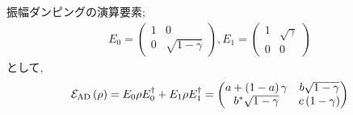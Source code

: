 \begin{ex}
    \label{ex8.22}
    振幅ダンピングの演算要素;
    \begin{align*}
        E_0 =
        \begin{pmatrix}
            1 & 0                \\
            0 & \sqrt{1- \gamma}
        \end{pmatrix}
        ,
        E_1 =
        \begin{pmatrix}
            1 & \sqrt{\gamma} \\
            0 & 0
        \end{pmatrix}
    \end{align*}
    として,
    \begin{align*}
        \mathcal{E}_\mathrm{AD} \left(\rho\right)
        =
        E_0 \rho E_0^\dagger + E_1 \rho E_1^\dagger
        =
        \begin{pmatrix}
            a + \left(1-a\right) \gamma & b \sqrt{1-\gamma}      \\
            b^*\sqrt{1- \gamma}         & c\left(1-\gamma\right)
        \end{pmatrix}
    \end{align*}
\end{ex}

